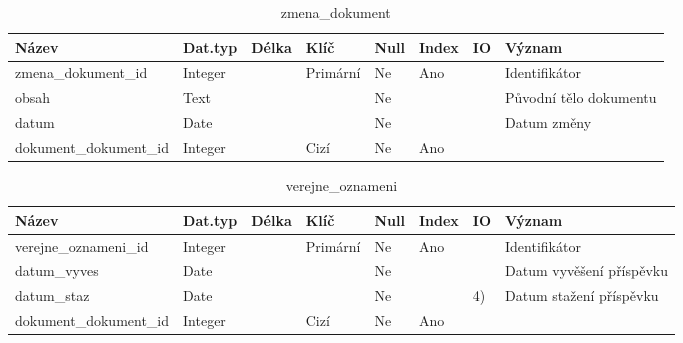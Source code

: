 \documentclass[12pt]{article}
\begin{document}
\begin{enumerate}
\begin{enumerate}[label*=\arabic*.]
		\begin{table}[htp]
			\caption{zmena\_dokument}
			\begin{tabularx}{1.25\textwidth}{|P{3.5cm}|p{1.6cm}|p{1.2cm}|p{1.6cm}|p{1cm}|p{1.2cm}|p{1cm}|X|}
				\hline
				\textbf{Název}& \textbf{Dat.typ} & \textbf{Délka} & \textbf{Klíč} & \textbf{Null}&\textbf{Index}& \textbf{IO}& \textbf{Význam} \\
				\hline
				zmena\_dokument\_id&Integer&&Primární&Ne&Ano&&Identifikátor\\
				\hline
				obsah&Text&&&Ne&&&Původní tělo dokumentu\\
				\hline
				datum&Date&&&Ne&&&Datum změny\\
				\hline
				dokument\_dokument\_id&Integer&&Cizí&Ne&Ano&&\\
				\hline
				

			\end{tabularx}
		\end{table}

		\begin{table}[htp]
			\caption{verejne\_oznameni}
			\begin{tabularx}{1.25\textwidth}{|P{3.5cm}|p{1.6cm}|p{1.2cm}|p{1.6cm}|p{1cm}|p{1.2cm}|p{1cm}|X|}
				\hline	
				\textbf{Název}& \textbf{Dat.typ} & \textbf{Délka} & \textbf{Klíč} & \textbf{Null}&\textbf{Index}& \textbf{IO}& \textbf{Význam} \\
				\hline			
				verejne\_oznameni\_id&Integer&&Primární&Ne&Ano&&Identifikátor\\
				\hline
				datum\_vyves&Date&&&Ne&&&Datum vyvěšení příspěvku\\
				\hline
				datum\_staz&Date&&&Ne&&4\big)&Datum stažení příspěvku\\
				\hline
				dokument\_dokument\_id&Integer&&Cizí&Ne&Ano&&\\
				\hline

			\end{tabularx}
		\end{table}	


\end{enumerate}
\end{enumerate}
\end{document}
